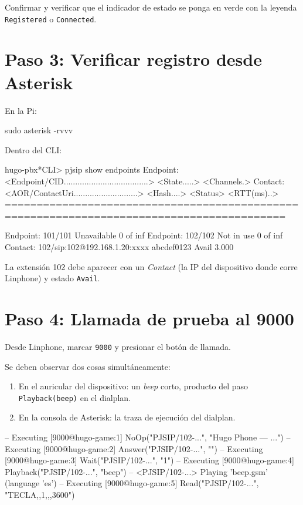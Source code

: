 Confirmar y verificar que el indicador de estado se ponga en verde con la leyenda \texttt{Registered} o \texttt{Connected}.

\section{Paso 3: Verificar registro desde Asterisk}

En la Pi:

\begin{shellcode}
sudo asterisk -rvvv
\end{shellcode}

Dentro del CLI:

\begin{plaincode}
hugo-pbx*CLI> pjsip show endpoints
 Endpoint:  <Endpoint/CID.....................................>  <State.....>  <Channels.>
 Contact:   <AOR/ContactUri............................>  <Hash....> <Status> <RTT(ms)..>
==========================================================================================

 Endpoint:  101/101                                              Unavailable   0 of inf
 Endpoint:  102/102                                              Not in use    0 of inf
        Contact:  102/sip:102@192.168.1.20:xxxx                  abcdef0123   Avail        3.000
\end{plaincode}

La extensión 102 debe aparecer con un \emph{Contact} (la IP del dispositivo donde corre Linphone) y estado \texttt{Avail}.

\section{Paso 4: Llamada de prueba al 9000}

Desde Linphone, marcar \texttt{9000} y presionar el botón de llamada.

Se deben observar dos cosas simultáneamente:

\begin{enumerate}
  \item En el auricular del dispositivo: un \emph{beep} corto, producto del paso \texttt{Playback(beep)} en el dialplan.
  \item En la consola de Asterisk: la traza de ejecución del dialplan.
\end{enumerate}

\begin{plaincode}
-- Executing [9000@hugo-game:1] NoOp("PJSIP/102-...", "Hugo Phone — ...")
-- Executing [9000@hugo-game:2] Answer("PJSIP/102-...", "")
-- Executing [9000@hugo-game:3] Wait("PJSIP/102-...", "1")
-- Executing [9000@hugo-game:4] Playback("PJSIP/102-...", "beep")
-- <PJSIP/102-...> Playing 'beep.gsm' (language 'es')
-- Executing [9000@hugo-game:5] Read("PJSIP/102-...", "TECLA,,1,,,3600")
\end{plaincode}


